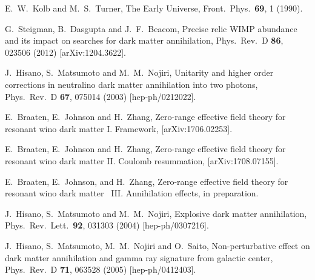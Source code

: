 \documentclass[%
 reprint,
 amsmath,amssymb,
 aps,
]{revtex4-1}
\begin{document}
\begin{thebibliography}{99}

  E.~W.~Kolb and M.~S.~Turner,
 The Early Universe,
  Front.\ Phys.\  {\bf 69}, 1 (1990).


  G.~Steigman, B.~Dasgupta and J.~F.~Beacom,
 Precise relic WIMP abundance and its impact on searches for dark matter annihilation,
  Phys.\ Rev.\ D {\bf 86}, 023506 (2012)
  [arXiv:1204.3622].


  J.~Hisano, S.~Matsumoto and M.~M.~Nojiri,
 Unitarity and higher order corrections in neutralino dark matter annihilation into two photons,
  Phys.\ Rev.\ D {\bf 67}, 075014 (2003)
  [hep-ph/0212022].


  E.~Braaten, E.~Johnson and H.~Zhang,
 Zero-range effective field theory for resonant wino dark matter I. Framework,
  [arXiv:1706.02253].


  E.~Braaten, E.~Johnson and H.~Zhang,
 Zero-range effective field theory for resonant wino dark matter II. Coulomb resummation,
  [arXiv:1708.07155].

  E.~Braaten, E.~Johnson, and H.~Zhang,
  Zero-range effective field theory for resonant wino  dark matter  ~III. Annihilation effects,
  in preparation.

  J.~Hisano, S.~Matsumoto and M.~M.~Nojiri,
 Explosive dark matter annihilation,
  Phys.\ Rev.\ Lett.\  {\bf 92}, 031303 (2004)
  [hep-ph/0307216].


  J.~Hisano, S.~Matsumoto, M.~M.~Nojiri and O.~Saito,
 Non-perturbative effect on dark matter annihilation and gamma ray signature from galactic center,
  Phys.\ Rev.\ D {\bf 71}, 063528 (2005)
  [hep-ph/0412403].



\end{thebibliography}
\end{document}
